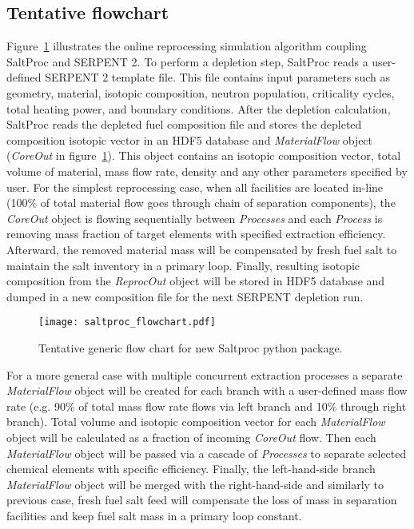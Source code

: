\subsection{Tentative flowchart}
Figure~\ref{fig:saltproc_flow} illustrates the online reprocessing simulation 
algorithm coupling SaltProc and SERPENT 2. To perform a depletion step, 
SaltProc reads a user-defined SERPENT 2 template file. This file contains input 
 parameters such as geometry, material, isotopic composition, neutron 
population, criticality cycles, total heating power, and boundary conditions.  
After the depletion calculation, SaltProc reads the depleted fuel composition 
file and stores the depleted composition isotopic vector in an HDF5 database 
and \textit{MaterialFlow} object (\textit{CoreOut} in 
figure~\ref{fig:saltproc_flow}). This object contains an isotopic composition 
vector, total volume of material, mass flow rate, density and any other 
parameters specified by user. For the simplest reprocessing case, when all 
facilities are located in-line (100\% of total material flow goes through 
chain of separation components), the \textit{CoreOut} object is flowing 
sequentially between \textit{Processes} and each \textit{Process} is 
removing mass fraction of target elements with specified extraction 
efficiency. Afterward, the removed material mass will be compensated by 
fresh fuel salt to maintain the salt inventory in a primary loop. 
Finally, resulting isotopic composition from the \textit{ReprocOut} object will 
be stored in HDF5 database and dumped in a new composition file for the next 
SERPENT depletion run. 
\begin{figure}[ht!] %
  \texttt{[image: saltproc\_flowchart.pdf]}
  \caption{Tentative generic flow chart for new Saltproc python package.}
  \label{fig:saltproc_flow}
\end{figure}

For a more general case with multiple concurrent extraction processes a separate 
\textit{MaterialFlow} object will be created for each branch with a user-defined 
mass flow rate (e.g. 90\% of total mass flow rate flows via left branch and 
10\% through right branch). Total volume and isotopic composition vector 
for each \textit{MaterialFlow} object will be calculated as a fraction of incoming 
\textit{CoreOut} flow. Then each \textit{MaterialFlow} object will be passed via 
a cascade of \textit{Processes} to separate selected chemical elements with 
specific efficiency. Finally, the left-hand-side branch \textit{MaterialFlow} object 
will be merged with the right-hand-side and similarly to previous case, fresh 
fuel salt feed will compensate the loss of mass in separation facilities and keep 
fuel salt mass in a primary loop constant.

